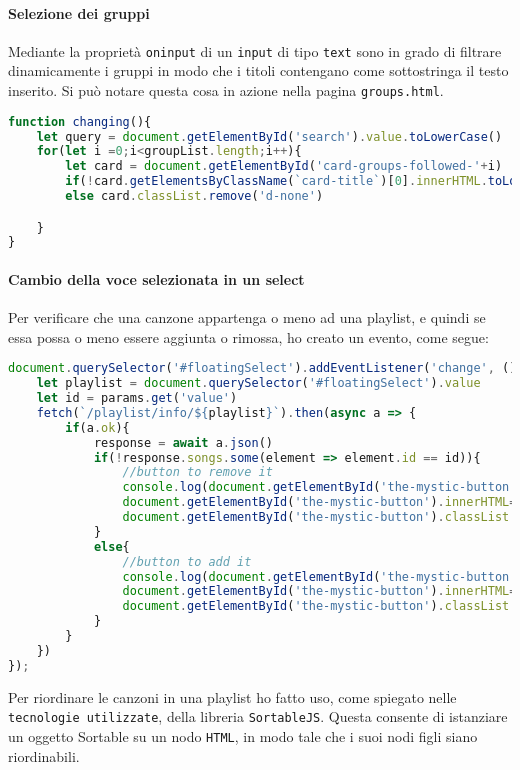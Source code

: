 \paragraph{Selezione dei gruppi} Mediante la proprietà \verb|oninput| di un \verb|input| di tipo \verb|text| sono in grado di filtrare dinamicamente i gruppi in modo che i titoli contengano come sottostringa il testo inserito. Si può notare questa cosa in azione nella pagina \verb|groups.html|.
\begin{lstlisting}[language=JavaScript]
function changing(){
    let query = document.getElementById('search').value.toLowerCase()
    for(let i =0;i<groupList.length;i++){
        let card = document.getElementById('card-groups-followed-'+i)
        if(!card.getElementsByClassName(`card-title`)[0].innerHTML.toLowerCase().includes(query)) card.classList.add('d-none')
        else card.classList.remove('d-none')

    }
}
\end{lstlisting}
\paragraph{Cambio della voce selezionata in un select} Per verificare che una canzone appartenga o meno ad una playlist, e quindi se essa possa o meno essere aggiunta o rimossa, ho creato un evento, come segue:
\begin{lstlisting}[language=JavaScript]
document.querySelector('#floatingSelect').addEventListener('change', () =>{
    let playlist = document.querySelector('#floatingSelect').value
    let id = params.get('value')
    fetch(`/playlist/info/${playlist}`).then(async a => {
        if(a.ok){
            response = await a.json()
            if(!response.songs.some(element => element.id == id)){
                //button to remove it
                console.log(document.getElementById('the-mystic-button').onclick)
                document.getElementById('the-mystic-button').innerHTML='Add it!'
                document.getElementById('the-mystic-button').classList.add('text-bg-success')
            }
            else{
                //button to add it
                console.log(document.getElementById('the-mystic-button').onclick)
                document.getElementById('the-mystic-button').innerHTML='Remove it!'
                document.getElementById('the-mystic-button').classList.add('text-bg-danger')
            }
        }
    })
});
\end{lstlisting}
Per riordinare le canzoni in una playlist ho fatto uso, come spiegato nelle \verb|tecnologie utilizzate|, della libreria \verb|SortableJS|. Questa consente di istanziare un oggetto Sortable su un nodo \verb|HTML|, in modo tale che i suoi nodi figli siano riordinabili.

